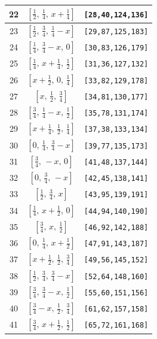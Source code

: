 \documentclass[fleqn,8pt]{jsarticle}
\begin{document}
\begin{longtable}{ccc}
22 & $\left[ \frac{1}{2},\, \frac{1}{4},\, x + \frac{1}{4} \right]$ & {\tt [28,40,124,136]} \\ \hline
23 & $\left[ \frac{1}{2},\, \frac{3}{4},\, \frac{1}{4} - x \right]$ & {\tt [29,87,125,183]} \\ \hline
24 & $\left[ \frac{1}{4},\, \frac{3}{4} - x,\, 0 \right]$ & {\tt [30,83,126,179]} \\ \hline
25 & $\left[ \frac{1}{4},\, x + \frac{1}{4},\, \frac{1}{2} \right]$ & {\tt [31,36,127,132]} \\ \hline
26 & $\left[ x + \frac{1}{2},\, 0,\, \frac{1}{4} \right]$ & {\tt [33,82,129,178]} \\ \hline
27 & $\left[ x,\, \frac{1}{2},\, \frac{3}{4} \right]$ & {\tt [34,81,130,177]} \\ \hline
28 & $\left[ \frac{3}{4},\, \frac{1}{4} - x,\, \frac{1}{2} \right]$ & {\tt [35,78,131,174]} \\ \hline
29 & $\left[ x + \frac{1}{4},\, \frac{1}{2},\, \frac{1}{4} \right]$ & {\tt [37,38,133,134]} \\ \hline
30 & $\left[ 0,\, \frac{1}{4},\, \frac{3}{4} - x \right]$ & {\tt [39,77,135,173]} \\ \hline
31 & $\left[ \frac{3}{4},\, - x,\, 0 \right]$ & {\tt [41,48,137,144]} \\ \hline
32 & $\left[ 0,\, \frac{3}{4},\, - x \right]$ & {\tt [42,45,138,141]} \\ \hline
33 & $\left[ \frac{1}{2},\, \frac{3}{4},\, x \right]$ & {\tt [43,95,139,191]} \\ \hline
34 & $\left[ \frac{1}{4},\, x + \frac{1}{2},\, 0 \right]$ & {\tt [44,94,140,190]} \\ \hline
35 & $\left[ \frac{3}{4},\, x,\, \frac{1}{2} \right]$ & {\tt [46,92,142,188]} \\ \hline
36 & $\left[ 0,\, \frac{1}{4},\, x + \frac{1}{2} \right]$ & {\tt [47,91,143,187]} \\ \hline
37 & $\left[ x + \frac{1}{2},\, \frac{1}{2},\, \frac{3}{4} \right]$ & {\tt [49,56,145,152]} \\ \hline
38 & $\left[ \frac{1}{2},\, \frac{3}{4},\, \frac{3}{4} - x \right]$ & {\tt [52,64,148,160]} \\ \hline
39 & $\left[ \frac{3}{4},\, \frac{3}{4} - x,\, \frac{1}{2} \right]$ & {\tt [55,60,151,156]} \\ \hline
40 & $\left[ \frac{3}{4} - x,\, \frac{1}{2},\, \frac{3}{4} \right]$ & {\tt [61,62,157,158]} \\ \hline
41 & $\left[ \frac{3}{4},\, x + \frac{1}{2},\, \frac{1}{2} \right]$ & {\tt [65,72,161,168]} \\ \hline

\end{longtable}
\end{document}
